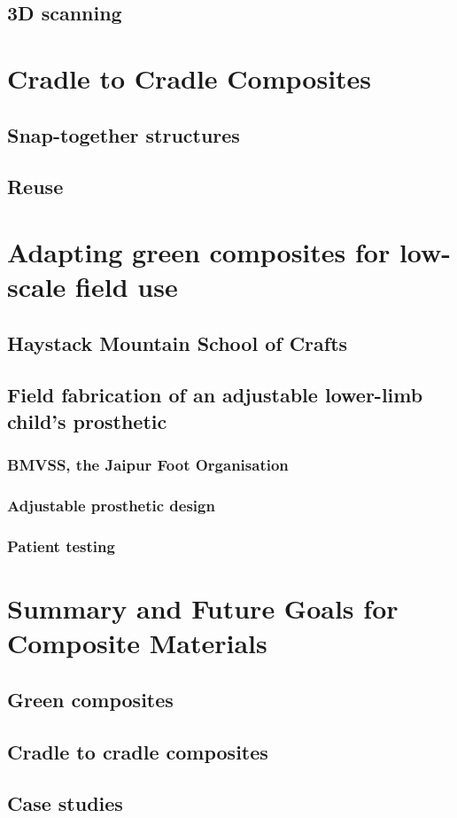 \documentclass[]{report}
\begin{document}
\section{3D scanning}



\chapter{Cradle to Cradle Composites}
\label{chap:cradle}
\section{Snap-together structures}
\section{Reuse}

\chapter{Adapting green composites for low-scale field use}
\label{chap:cases}

\section{Haystack Mountain School of Crafts}

\section{Field fabrication of an adjustable lower-limb child's prosthetic}
\subsection{BMVSS, the Jaipur Foot Organisation}
\subsection{Adjustable prosthetic design}
\subsection{Patient testing}


\chapter{Summary and Future Goals for Composite Materials}
\label{chap:summary}
\section{Green composites}
\section{Cradle to cradle composites}
\section{Case studies}



\end{document}
